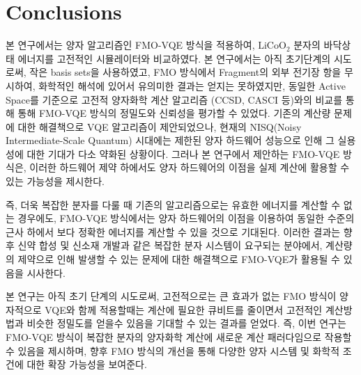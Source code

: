 \documentclass[pdflatex,sn-mathphys-num]{sn-jnl}%
\theoremstyle{thmstyleone}%
\theoremstyle{thmstyletwo}%
\theoremstyle{thmstylethree}%
\begin{document}
\section{Conclusions}
본 연구에서는 양자 알고리즘인 FMO-VQE 방식을 적용하여, \(\mathrm{LiCoO_2}\)  분자의 바닥상태 에너지를 고전적인 시뮬레이터와 비교하였다. 본 연구에서는 아직 초기단계의 시도로써, 작은 basis sets을 사용하였고, FMO 방식에서 Fragment의 외부 전기장 항을 무시하여, 화학적인 해석에 있어서 유의미한 결과는 얻지는 못하였지만, 동일한 Active Space를 기준으로 고전적 양자화학 계산 알고리즘 (CCSD, CASCI 등)와의 비교를 통해 통해 FMO-VQE 방식의 정밀도와 신뢰성을 평가할 수 있었다.
기존의 계산량 문제에 대한 해결책으로 VQE 알고리즘이 제안되었으나, 현재의 NISQ(Noisy Intermediate-Scale Quantum) 시대에는 제한된 양자 하드웨어 성능으로 인해 그 실용성에 대한 기대가 다소 약화된 상황이다. 그러나 본 연구에서 제안하는 FMO-VQE 방식은, 이러한 하드웨어 제약 하에서도 양자 하드웨어의 이점을 실제 계산에 활용할 수 있는 가능성을 제시한다.

즉, 더욱 복잡한 분자를 다룰 때 기존의 알고리즘으로는 유효한 에너지를 계산할 수 없는 경우에도, FMO-VQE 방식에서는 양자 하드웨어의 이점을 이용하여 동일한 수준의 근사 하에서 보다 정확한 에너지를 계산할 수 있을 것으로 기대된다. 이러한 결과는 향후 신약 합성 및 신소재 개발과 같은 복잡한 분자 시스템이 요구되는 분야에서, 계산량의 제약으로 인해 발생할 수 있는 문제에 대한 해결책으로 FMO-VQE가 활용될 수 있음을 시사한다. 

본 연구는 아직 초기 단계의 시도로써, 고전적으로는 큰 효과가 없는 FMO 방식이 양자적으로 VQE와 함께 적용할때는 계산에 필요한 큐비트를 줄이면서 고전적인 계산방법과 비슷한 정밀도를 얻을수 있음을 기대할 수 있는 결과를 얻었다. 즉, 이번 연구는 FMO-VQE 방식이 복잡한 분자의 양자화학 계산에 새로운 계산 패러다임으로 작용할 수 있음을 제시하며, 향후 FMO 방식의 개선을 통해 다양한 양자 시스템 및 화학적 조건에 대한 확장 가능성을 보여준다.
\end{document}
